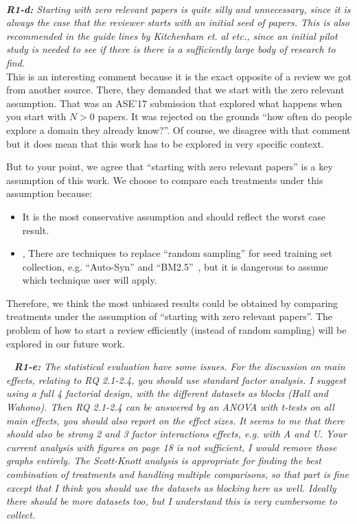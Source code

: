 \documentclass{svjour3}
\theoremstyle{break}
\newcommand{\review}[1]{{\textit{#1}}~\\}
\begin{document}
\par ~

\review{\textbf{R1-d:} Starting with zero relevant papers is quite silly and unnecessary, since it is always the case that the reviewer starts with an initial seed of papers. This is also recommended in the guide lines by Kitchenham et. al etc., since an initial pilot study is needed to see if there is there is a sufficiently large body of research to find.
}

This is an interesting comment because it is the exact opposite of a review we got from another source. There, they demanded that we start with the zero relevant assumption.
That was an ASE'17 submission   that explored what happens when you start with $N>0$ papers. It  was rejected on the grounds ``how often do people explore a domain they already know?''. Of course, we disagree with that comment but it does mean that this work has to be explored in very specific context.

But to your point, we agree that ``starting with zero relevant papers'' is a key assumption of this work.
We choose to compare each treatments under this assumption because:
\begin{itemize}
\item
It is the most conservative assumption and should reflect the worst case result.  \item,
There are techniques to replace ``random sampling'' for seed training set collection, e.g. ``Auto-Syn'' and ``BM2.5''~\cite{cormack2015autonomy}, but it is dangerous to assume which technique user will apply.
\end{itemize}
Therefore, we think the most unbiased results could be obtained by comparing treatments under the assumption of ``starting with zero relevant papers''. The problem of how to start a review efficiently (instead of random sampling) will be explored in our future work.

\par ~
\review{\textbf{R1-e:} The statistical evaluation have some issues. For the discussion on main effects, relating to RQ 2.1-2.4, you should use standard factor analysis. I suggest using a full 4 factorial design, with the different datasets as blocks (Hall and Wahono). Then RQ 2.1-2.4 can be answered by an ANOVA with t-tests on all main effects, you should also report on the effect sizes. It seems to me that there should also be strong 2 and 3 factor interactions effects, e.g. with A and U. Your current analysis with figures on page 18 is not sufficient, I would remove those graphs entirely. The Scott-Knott analysis is appropriate for finding the best combination of treatments and handling multiple comparisons, so that part is fine except that I think you should use the datasets as blocking here as well. Ideally there should be more datasets too, but I understand this is very cumbersome to collect.}
\end{document}
